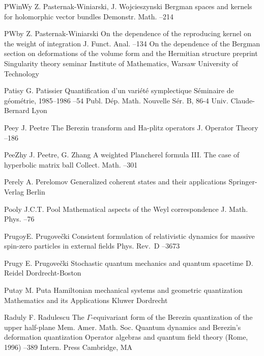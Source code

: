 \documentclass[12pt]{amsart}
\numberwithin{equation}{section}
\theoremstyle{remark}
\newcommand{\by}{\mathbf y}
\begin{document}
\begin{thebibliography}{199}
 PWinW\by{ Z. Pasternak-Winiarski, J. Wojcieszynski \paper Bergman
spaces and kernels for holomorphic vector bundles \jour Demonstr. Math.
  --214}

 PWb\by{ Z. Pasternak-Winiarski \paper On the dependence of the
reproducing kernel on the weight of integration \jour J. Funct. Anal. 
 --134  \moreref \paper On the dependence of the Bergman
section on deformations of the volume form and the Hermitian structure
\paperinfo preprint \inbook Singularity theory seminar \publ Institute of
Mathematics, Warsaw University of Technology }

 Patis\by{ G. Patissier \paper Quantification d'un vari\'et\'e
symplectique \inbook S\'eminaire de g\'eom\'etrie, 1985--1986 --54
\bookinfo Publ. D\'ep. Math. Nouvelle S\'er. B, 86-4 \publ Univ. Claude-Bernard
\publaddr Lyon }

 Pee\by{ J. Peetre \paper The Berezin transform and Ha-plitz operators
\jour J. Operator Theory   --186}

 PeeZh\by{ J. Peetre, G. Zhang \paper A weighted Plancherel formula III.
The case of hyperbolic matrix ball \jour Collect. Math.  
--301}

 Perel\by{ A. Perelomov \book Generalized coherent states and their
applications \publ Springer-Verlag \publaddr Berlin }

 Pool\by{ J.C.T. Pool \paper Mathematical aspects of the Weyl
correspondence \jour J. Math. Phys.   --76}

 Prugo\by{E. Prugove\v cki \paper Consistent formulation of relativistic
dynamics for massive spin-zero particles in external fields \jour Phys. Rev.~D
  --3673}

 Prug\by{ E. Prugove\v cki \book Stochastic quantum mechanics and quantum
spacetime \publ D. Reidel \publaddr Dordrecht-Boston }

 Puta\by{ M. Puta \book Hamiltonian mechanical systems and geometric
quantization \bookinfo Mathematics and its Applications  \publ
Kluwer \publaddr Dordrecht }

 Radul\by{ F. Radulescu \paper The $\Gamma$-equivariant form of the
Berezin quantization of the upper half-plane \jour Mem. Amer. Math. Soc.    \moreref \paper Quantum dynamics and Berezin's
deformation quantization \inbook Operator algebras and quantum field theory
(Rome, 1996) --389 \publ Intern. Press \publaddr Cambridge, MA }


\end{thebibliography}
\end{document}
